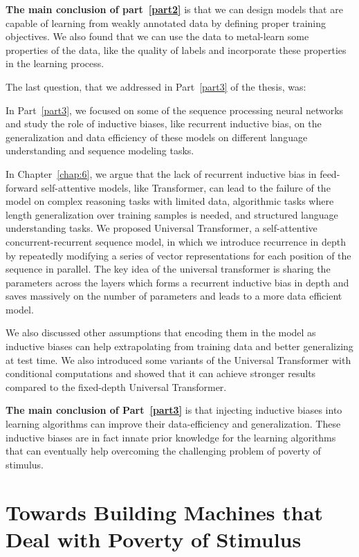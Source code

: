\textbf{The main conclusion of part~\ref{part2}} is that we can design models that are capable of learning from weakly annotated data by defining proper training objectives. We also found that we can use the data to metal-learn some properties of the data, like the quality of labels and incorporate these properties in the learning process.


The last question, that we addressed in Part~\ref{part3} of the thesis, was:
%

In Part~\ref{part3}, we focused on some of the sequence processing neural networks and study the role of inductive biases, like recurrent inductive bias, on the generalization and data efficiency of these models on different language understanding and sequence modeling tasks.

In Chapter~\ref{chap:6}, we argue that the lack of recurrent inductive bias in feed-forward self-attentive models, like Transformer, can lead to the failure of the model on complex reasoning tasks with limited data, algorithmic tasks where length generalization over training samples is needed, and structured language understanding tasks. We proposed Universal Transformer, a self-attentive concurrent-recurrent sequence model, in which we introduce recurrence in depth by repeatedly modifying a series of vector representations for each position of the sequence in parallel. The key idea of the universal transformer is sharing the parameters across the layers which forms a recurrent inductive bias in depth and saves massively on the number of parameters and leads to a more data efficient model. 

We also discussed other assumptions that encoding them in the model as inductive biases can help extrapolating from training data and better generalizing at test time.  We also introduced some variants of the Universal Transformer with conditional computations and showed that it can achieve stronger results compared to the fixed-depth Universal Transformer.

\textbf{The main conclusion of Part~\ref{part3}} is that injecting inductive biases into learning algorithms can improve their data-efficiency and generalization. These inductive biases are in fact innate prior knowledge for the learning algorithms that can eventually help overcoming the challenging problem of poverty of stimulus.


\section{Towards Building Machines that Deal with Poverty of Stimulus}

